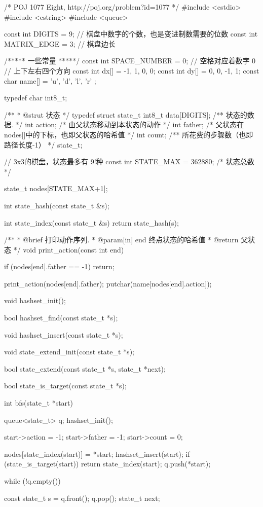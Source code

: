 \begin{Codex}[label=eight_digits_bfs.c]
/* POJ 1077 Eight, http://poj.org/problem?id=1077 */
#include <cstdio>
#include <cstring>
#include <queue>

const int DIGITS = 9; // 棋盘中数字的个数，也是变进制数需要的位数
const int MATRIX_EDGE = 3;       // 棋盘边长

/***** 一些常量 *****/
const int SPACE_NUMBER = 0; // 空格对应着数字 0
// 上下左右四个方向
const int dx[] = {-1, 1, 0, 0};
const int dy[] = {0, 0, -1, 1};
const char name[] = { 'u', 'd', 'l', 'r' };

typedef char int8_t;

/**
 * @strut 状态
 */
typedef struct state_t {
    int8_t data[DIGITS];  /** 状态的数据. */
    int action; /* 由父状态移动到本状态的动作 */
    int father; /* 父状态在nodes[]中的下标，也即父状态的哈希值 */
    int count;  /** 所花费的步骤数（也即路径长度-1） */
} state_t;

// 3x3的棋盘，状态最多有 9!种
const int STATE_MAX = 362880;  /* 状态总数 */

state_t nodes[STATE_MAX+1];

int state_hash(const state_t &s);

int state_index(const state_t &s) {
    return state_hash(s);
}

/**
 * @brief 打印动作序列.
 * @param[in] end 终点状态的哈希值
 * @return 父状态
 */
void print_action(const int end) {
    if (nodes[end].father == -1) return;

    print_action(nodes[end].father);
    putchar(name[nodes[end].action]);
}

void hashset_init();

bool hashset_find(const state_t *s);

void hashset_insert(const state_t *s);

void state_extend_init(const state_t *s);

bool state_extend(const state_t *s, state_t *next);

bool state_is_target(const state_t *s);


int bfs(state_t *start) {
    queue<state_t> q;
    hashset_init();

    start->action = -1;
    start->father = -1;
    start->count = 0;

    nodes[state_index(start)] = *start;
    hashset_insert(start);
    if (state_is_target(start))
        return state_index(start);
    q.push(*start);

    while (!q.empty()) {
        const state_t s = q.front(); q.pop();
        state_t next;

}}
\end{Codex}
